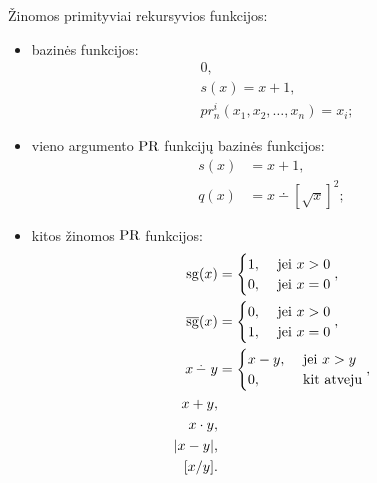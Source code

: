 \begin{note}
  Žinomos primityviai rekursyvios funkcijos:
  \begin{itemize}
    \item bazinės funkcijos:
      \begin{align*}
        & 0,\\
        & s(x) = x + 1, \\
        & pr^{i}_{n}(x_1,x_2,\dotsc,x_n) = x_i;
      \end{align*}
    \item vieno argumento $\mathop{\text{PR}}$ funkcijų bazinės funkcijos:
      \begin{align*}
        s(x) &= x + 1, \\
        q(x) &= x \dotminus \left[ \sqrt{x} \right]^{2};
      \end{align*}
    \item kitos žinomos $\mathop{\text{PR}}$ funkcijos:
      \begin{align*}
        \sg(x) &= %
        \begin{cases}
          1, & \text{ jei } x > 0 \\
          0, & \text{ jei } x = 0
        \end{cases}, \\
        \sgi(x) &= %
        \begin{cases}
          0, & \text{ jei } x > 0 \\
          1, & \text{ jei } x = 0
        \end{cases}, \\
        x \dotminus y &=%
        \begin{cases}
          x - y, & \text{ jei } x > y \\
          0, & \text{ kit atveju}
        \end{cases}, \\
        x + y,& \\
        x \cdot y, & \\
        |x - y|, & \\
        [x / y]. & 
      \end{align*}
  \end{itemize}
\end{note}

